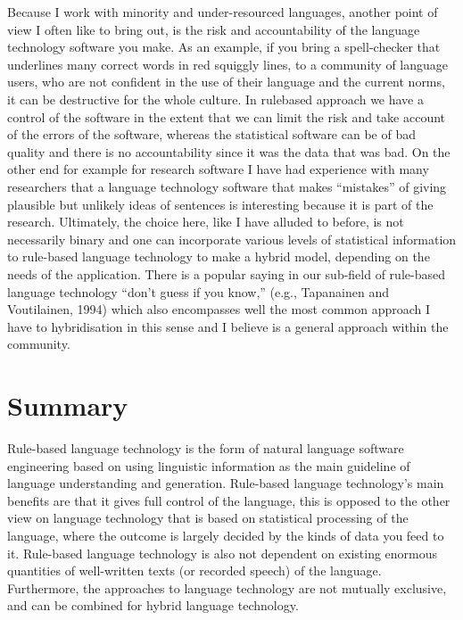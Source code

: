 \documentclass[free]{flammie}
\begin{document}
Because I work with minority and under-resourced languages, another point of
view I often like to bring out, is the risk and accountability of the language
technology software you make. As an example, if you bring a spell-checker that
underlines many correct words in red squiggly lines, to a community of language
users, who are not confident in the use of their language and the current norms,
it can be destructive for the whole culture. In rulebased approach we have a
control of the software in the extent that we can limit the risk and take
account of the errors of the software, whereas the statistical software can be
of bad quality and there is no accountability since it was the data that was
bad. On the other end for example for research software I have had experience
with many researchers that a language technology software that makes “mistakes”
of giving plausible but unlikely ideas of sentences is interesting because it is
part of the research.  Ultimately, the choice here, like I have alluded to
before, is not necessarily binary and one can incorporate various levels of
statistical information to rule-based language technology to make a hybrid
model, depending on the needs of the application. There is a popular saying in
our sub-field of rule-based language technology “don’t guess if you know,”
(e.g., Tapanainen and Voutilainen, 1994) which also encompasses well the most
common approach I have to hybridisation in this sense and I believe is a general
approach within the community.

\section{Summary}

Rule-based language technology is the form of natural language software
engineering based on using linguistic information as the main guideline of
language understanding and generation. Rule-based language technology’s main
benefits are that it gives full control of the language, this is opposed to the
other view on language technology that is based on statistical processing of the
language, where the outcome is largely decided by the kinds of data you feed to
it. Rule-based language technology is also not dependent on existing enormous
quantities of well-written texts (or recorded speech) of the language.
Furthermore, the approaches to language technology are not mutually exclusive,
and can be combined for hybrid language technology.



\end{document}
